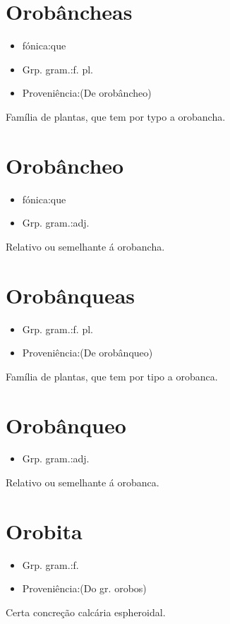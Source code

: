 \section{Orobâncheas}
\begin{itemize}
\item {fónica:que}
\end{itemize}
\begin{itemize}
\item {Grp. gram.:f. pl.}
\end{itemize}
\begin{itemize}
\item {Proveniência:(De \textunderscore orobâncheo\textunderscore )}
\end{itemize}
Família de plantas, que tem por typo a orobancha.
\section{Orobâncheo}
\begin{itemize}
\item {fónica:que}
\end{itemize}
\begin{itemize}
\item {Grp. gram.:adj.}
\end{itemize}
Relativo ou semelhante á orobancha.
\section{Orobânqueas}
\begin{itemize}
\item {Grp. gram.:f. pl.}
\end{itemize}
\begin{itemize}
\item {Proveniência:(De \textunderscore orobânqueo\textunderscore )}
\end{itemize}
Família de plantas, que tem por tipo a orobanca.
\section{Orobânqueo}
\begin{itemize}
\item {Grp. gram.:adj.}
\end{itemize}
Relativo ou semelhante á orobanca.
\section{Orobita}
\begin{itemize}
\item {Grp. gram.:f.}
\end{itemize}
\begin{itemize}
\item {Proveniência:(Do gr. \textunderscore orobos\textunderscore )}
\end{itemize}
Certa concreção calcária espheroidal.
